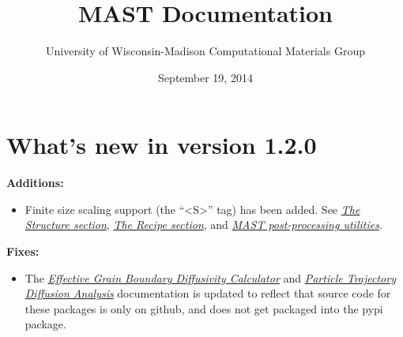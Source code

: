 \documentclass[letterpaper,10pt,english]{sphinxmanual}
\title{MAST Documentation}
\date{September 19, 2014}
\author{University of Wisconsin-Madison Computational Materials Group}
\begin{document}
\maketitle
\tableofcontents
{}\label{index::doc}



\chapter{What's new in version 1.2.0}
\label{16_0_whatsnew::doc}\label{16_0_whatsnew:what-s-new-in-version-1-2-0}\label{16_0_whatsnew:materials-simulation-toolkit-mast-manual}
\textbf{Additions:}
\begin{itemize}
\item {} 
Finite size scaling support (the ``\textless{}S\textgreater{}'' tag) has been added. See {\hyperref[3_1_1_structure::doc]{\emph{The Structure section}}}, {\hyperref[3_1_3_recipe::doc]{\emph{The Recipe section}}}, and {\hyperref[6_0_postprocessingtools::doc]{\emph{MAST post-processing utilities}}}.

\end{itemize}

\textbf{Fixes:}
\begin{itemize}
\item {} 
The {\hyperref[8_0_2_gbdiff::doc]{\emph{Effective Grain Boundary Diffusivity Calculator}}} and {\hyperref[8_0_3_diffanalyzer::doc]{\emph{Particle Trajectory Diffusion Analysis}}} documentation is updated to reflect that source code for these packages is only on github, and does not get packaged into the pypi package.

\end{itemize}
\end{document}
